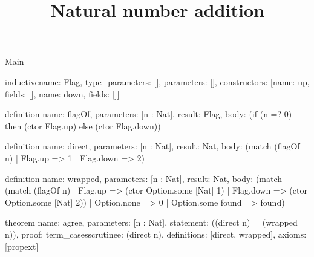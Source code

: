 \begin{lexlean}{Main}
\title{Natural number addition}
\begin{semanticmodule}
inductive{name: Flag, type_parameters: [], parameters: [], constructors: [{name: up, fields: []}, {name: down, fields: []}]}

definition{
  name: flagOf,
  parameters: [n : Nat],
  result: Flag,
  body: (if (n =? 0) then (ctor Flag.up) else (ctor Flag.down))
}

definition{
  name: direct,
  parameters: [n : Nat],
  result: Nat,
  body: (match (flagOf n)
    | Flag.up => 1
    | Flag.down => 2)
}

definition{
  name: wrapped,
  parameters: [n : Nat],
  result: Nat,
  body: (match (match (flagOf n)
    | Flag.up => (ctor Option.some [Nat] 1)
    | Flag.down => (ctor Option.some [Nat] 2))
    | Option.none => 0
    | Option.some found => found)
}

theorem{
  name: agree,
  parameters: [n : Nat],
  statement: ((direct n) = (wrapped n)),
  proof: term_cases{scrutinee: (direct n), definitions: [direct, wrapped]},
  axioms: [propext]
}
\end{semanticmodule}
\end{lexlean}
